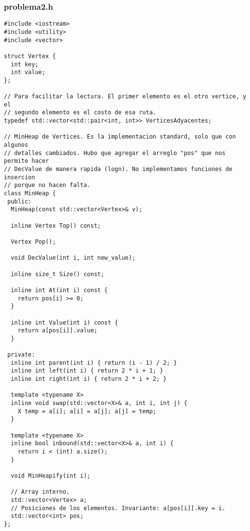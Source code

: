 \subsubsection{problema2.h}
\begin{lstlisting}[frame=single]
#include <iostream>
#include <utility>
#include <vector>

struct Vertex {
  int key;
  int value;
};

// Para facilitar la lectura. El primer elemento es el otro vertice, y el
// segundo elemento es el costo de esa ruta.
typedef std::vector<std::pair<int, int>> VerticesAdyacentes;

// MinHeap de Vertices. Es la implementacion standard, solo que con algunos 
// detalles cambiados. Hubo que agregar el arreglo "pos" que nos permite hacer
// DecValue de manera rapida (logn). No implementamos funciones de insercion
// porque no hacen falta.
class MinHeap {
 public:
  MinHeap(const std::vector<Vertex>& v);

  inline Vertex Top() const;

  Vertex Pop();

  void DecValue(int i, int new_value);

  inline size_t Size() const;

  inline int At(int i) const {
    return pos[i] >= 0;
  }

  inline int Value(int i) const {
    return a[pos[i]].value;
  }

 private:
  inline int parent(int i) { return (i - 1) / 2; }
  inline int left(int i) { return 2 * i + 1; }
  inline int right(int i) { return 2 * i + 2; }

  template <typename X>
  inline void swap(std::vector<X>& a, int i, int j) {
    X temp = a[i]; a[i] = a[j]; a[j] = temp;
  }

  template <typename X>
  inline bool inbound(std::vector<X>& a, int i) {
    return i < (int) a.size();
  }
  
  void MinHeapify(int i);

  // Array interno.
  std::vector<Vertex> a;
  // Posiciones de los elementos. Invariante: a[pos[i]].key = i.
  std::vector<int> pos;
};
\end{lstlisting}





